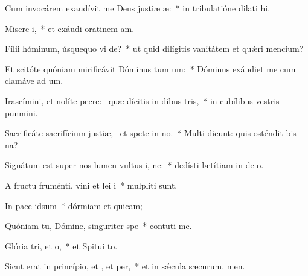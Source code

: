 \item Cum invocárem exaudívit me Deus justiæ æ:~* in tribulatióne dilati hi.
\item Misere i,~* et exáudi oratinem am.
\item Fílii hóminum, úsquequo vi de?~* ut quid dilígitis vanitátem et quǽri mencium?
\item Et scitóte quóniam mirificávit Dóminus tum um:~* Dóminus exáudiet me cum clamáve ad um.
\item Irascímini, et nolíte pecre:~\pscross{} quæ dícitis in dibus tris,~* in cubílibus vestris punmini.
\item Sacrificáte sacrifícium justiæ,~\pscross{} et spete in no.~* Multi dicunt: quis osténdit bis na?
\item Signátum est super nos lumen vultus i, ne:~* dedísti lætítiam in de o.
\item A fructu fruménti, vini et lei i~* mulpliti sunt.
\item In pace  idsum~* dórmiam et quicam;
\item Quóniam tu, Dómine, singuriter  spe~* contuti me.
\item Glória tri, et o,~* et Spitui to.
\item Sicut erat in princípio, et , et per,~* et in sǽcula sæcurum. men.
